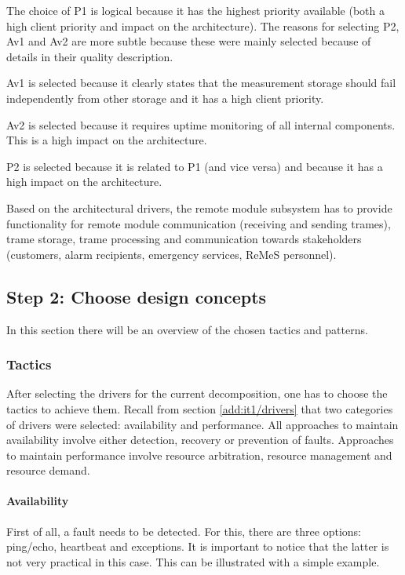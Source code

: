 \npar The choice of P1 is logical because it has the highest priority available
(both a high client priority and impact on the architecture). The reasons for
selecting P2, Av1 and Av2 are more subtle because these were mainly selected
because of details in their quality description.

\npar Av1 is selected because it clearly states that the measurement storage
should fail independently from other storage and it has a high client priority. 

\npar Av2 is selected because it requires uptime monitoring of all internal
components. This is a high impact on the architecture. 

\npar P2 is selected because it is related to P1 (and vice versa) and because it
has a high impact on the architecture. 

\npar Based on the architectural drivers, the remote module subsystem has to
provide functionality for remote module communication (receiving and sending
trames), trame storage, trame processing and communication towards stakeholders
(customers, alarm recipients, emergency services, ReMeS personnel).

\subsection{Step 2: Choose design concepts}
\label{add:it1/concepts}

\npar In this section there will be an overview of the chosen tactics and
patterns.

\subsubsection{Tactics}
\label{add:it1/tactics}
 
\npar After selecting the drivers for the current decomposition, one has to
choose the tactics to achieve them. Recall from section \ref{add:it1/drivers}
that two categories of drivers were selected: availability and performance. All
approaches to maintain availability involve either detection, recovery or
prevention of faults. Approaches to maintain performance involve resource
arbitration, resource management and resource demand.
 
\paragraph{Availability}

\npar First of all, a fault needs to be detected. For this, there are three
options: ping/echo, heartbeat and exceptions. It is important to notice that the
latter is not very practical in this case. This can be illustrated with a simple
example.

